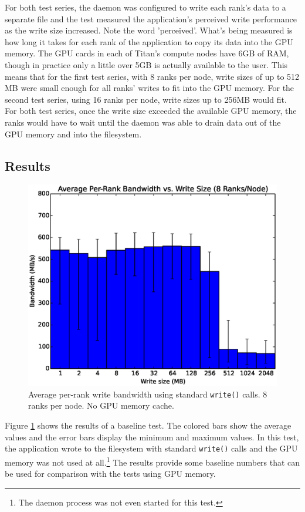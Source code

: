 For both test series, the daemon was configured to write each rank's data to a separate file and the test measured the application's perceived write performance as the write size increased.  Note the word 'perceived'.  What's being measured is how long it takes for each rank of the application to copy its data into the GPU memory.   The GPU cards in each of Titan's compute nodes have 6GB of RAM, though in practice only a little over 5GB is actually available to the user.  This means that for the first test series, with 8 ranks per node, write sizes of up to 512 MB were small enough for all ranks' writes to fit into the GPU memory.  For the second test series, using 16 ranks per node, write sizes up to 256MB would fit.  For both test series, once the write size exceeded the available GPU memory, the ranks would have to wait until the daemon was able to drain data out of the GPU memory and into the filesystem.


\subsection{Results}
\label{subsec:results}

\begin{figure}
\includegraphics[width=\linewidth]{figures/figure_1.eps}
\caption{Average per-rank write bandwidth using standard \texttt{write()} calls.  8 ranks per node. No GPU memory cache.} 
\label{fig:results_base_8}
\end{figure}

Figure \ref{fig:results_base_8} shows the results of a baseline test.  The colored bars show the average values and the error bars display the minimum and maximum values.  In this test, the application wrote to the filesystem with standard \texttt{write()} calls and the GPU memory was not used at all.\footnote{The daemon process was not even started for this test.}  The results provide some baseline numbers that can be used for comparison with the tests using GPU memory.

